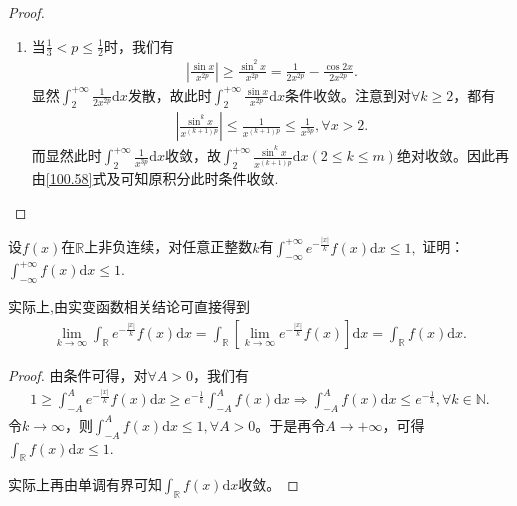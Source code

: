 \documentclass[../../main.tex]{subfiles}%
\begin{document}
\begin{proof}
\begin{enumerate}
\begin{enumerate}
\item 当\(\frac{1}{3}<p\leqslant \frac{1}{2}\)时，我们有
\begin{align*}
\left|\frac{\sin x}{x^{2p}}\right|\geqslant\frac{\sin^2 x}{x^{2p}}=\frac{1}{2x^{2p}}-\frac{\cos 2x}{2x^{2p}}.
\end{align*}
显然\(\int_{2}^{+\infty}\frac{1}{2x^{2p}}\mathrm{d}x\)发散，故此时\(\int_{2}^{+\infty}\frac{\sin x}{x^{2p}}\mathrm{d}x\)条件收敛。注意到对\(\forall k\geqslant 2\)，都有
\begin{align*}
\left|\frac{\sin^k x}{x^{(k + 1)p}}\right|\leqslant\frac{1}{x^{(k + 1)p}}\leqslant\frac{1}{x^{3p}},\forall x > 2.
\end{align*}
而显然此时\(\int_{2}^{+\infty}\frac{1}{x^{3p}}\mathrm{d}x\)收敛，故\(\int_{2}^{+\infty}\frac{\sin^k x}{x^{(k + 1)p}}\mathrm{d}x(2\leqslant  k\leqslant  m)\)绝对收敛。因此再由\eqref{100.58}式及可知原积分此时条件收敛.
\end{enumerate} 
\end{enumerate}
\end{proof}

\begin{example}
设\(f(x)\)在\(\mathbb{R}\)上非负连续，对任意正整数\(k\)有$\int_{-\infty}^{+\infty} e^{-\frac{|x|}{k}}f(x)\mathrm{d}x \leqslant  1,$
证明：$\int_{-\infty}^{+\infty}f(x)\mathrm{d}x \leqslant  1.$
\end{example}
\begin{remark}
实际上,由实变函数相关结论可直接得到
\begin{align*}
\lim_{k\rightarrow \infty}\int_{\mathbb{R}}e^{-\frac{| x |}{k}}f( x ) \mathrm{d}x=\int_{\mathbb{R}}\left[ \lim_{k\rightarrow \infty}e^{-\frac{| x |}{k}}f( x ) \right] \mathrm{d}x=\int_{\mathbb{R}}f( x ) \mathrm{d}x.
\end{align*}
\end{remark}
\begin{proof}
由条件可得，对$\forall A>0$，我们有
\begin{align*}
1\geqslant \int_{-A}^A{e^{-\frac{|x|}{k}}f(x)\mathrm{d}x}\geqslant e^{-\frac{1}{k}}\int_{-A}^A{f(x)\mathrm{d}x}\Longrightarrow \int_{-A}^A{f(x)\mathrm{d}x}\leqslant e^{-\frac{1}{k}},\forall k\in \mathbb{N} .
\end{align*}
令$k\rightarrow \infty$，则$\int_{-A}^Af( x ) \mathrm{d}x\leqslant 1,\forall A>0$。于是再令$A\rightarrow +\infty$，可得$\int_{\mathbb{R}}f( x ) \mathrm{d}x\leqslant 1.$

实际上再由单调有界可知$\int_{\mathbb{R}}f( x ) \mathrm{d}x$收敛。
\end{proof}
\end{document}

